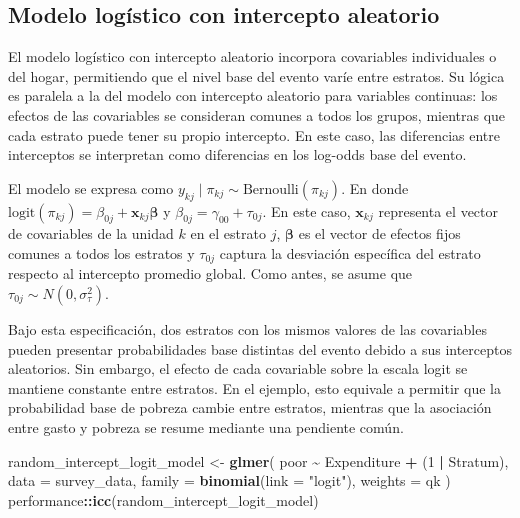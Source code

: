\documentclass[
  spanish,
  12pt,
]{book}
\newenvironment{Shaded}{\begin{snugshade}}{\end{snugshade}}
\newcommand{\AttributeTok}[1]{\textcolor[rgb]{0.13,0.29,0.53}{#1}}
\newcommand{\DecValTok}[1]{\textcolor[rgb]{0.00,0.00,0.81}{#1}}
\newcommand{\FunctionTok}[1]{\textcolor[rgb]{0.13,0.29,0.53}{\textbf{#1}}}
\newcommand{\NormalTok}[1]{#1}
\newcommand{\OtherTok}[1]{\textcolor[rgb]{0.56,0.35,0.01}{#1}}
\newcommand{\SpecialCharTok}[1]{\textcolor[rgb]{0.81,0.36,0.00}{\textbf{#1}}}
\newcommand{\StringTok}[1]{\textcolor[rgb]{0.31,0.60,0.02}{#1}}
\begin{document}
\subsection{Modelo logístico con intercepto aleatorio}\label{modelo-logistico-con-intercepto-aleatorio}

El modelo logístico con intercepto aleatorio incorpora covariables individuales o del hogar, permitiendo que el nivel base del evento varíe entre estratos. Su lógica es paralela a la del modelo con intercepto aleatorio para variables continuas: los efectos de las covariables se consideran comunes a todos los grupos, mientras que cada estrato puede tener su propio intercepto. En este caso, las diferencias entre interceptos se interpretan como diferencias en los log-odds base del evento.

El modelo se expresa como \(y_{kj} \mid \pi_{kj} \sim \text{Bernoulli}(\pi_{kj})\). En donde \(\text{logit}(\pi_{kj}) = \beta_{0j} + \mathbf{x}_{kj}\boldsymbol{\beta}\) y \(\beta_{0j} = \gamma_{00} + \tau_{0j}\). En este caso, \(\mathbf{x}_{kj}\) representa el vector de covariables de la unidad \(k\) en el estrato \(j\), \(\boldsymbol{\beta}\) es el vector de efectos fijos comunes a todos los estratos y \(\tau_{0j}\) captura la desviación específica del estrato respecto al intercepto promedio global. Como antes, se asume que \(\tau_{0j} \sim N(0,\sigma_{\tau}^{2})\).

Bajo esta especificación, dos estratos con los mismos valores de las covariables pueden presentar probabilidades base distintas del evento debido a sus interceptos aleatorios. Sin embargo, el efecto de cada covariable sobre la escala logit se mantiene constante entre estratos. En el ejemplo, esto equivale a permitir que la probabilidad base de pobreza cambie entre estratos, mientras que la asociación entre gasto y pobreza se resume mediante una pendiente común.

\begin{Shaded}
\begin{Highlighting}[]
\NormalTok{random\_intercept\_logit\_model }\OtherTok{\textless{}{-}} \FunctionTok{glmer}\NormalTok{(}
\NormalTok{  poor }\SpecialCharTok{\textasciitilde{}}\NormalTok{ Expenditure }\SpecialCharTok{+}\NormalTok{ (}\DecValTok{1} \SpecialCharTok{|}\NormalTok{ Stratum),}
  \AttributeTok{data =}\NormalTok{ survey\_data,}
  \AttributeTok{family =} \FunctionTok{binomial}\NormalTok{(}\AttributeTok{link =} \StringTok{"logit"}\NormalTok{),}
  \AttributeTok{weights =}\NormalTok{ qk}
\NormalTok{)}
\NormalTok{performance}\SpecialCharTok{::}\FunctionTok{icc}\NormalTok{(random\_intercept\_logit\_model)}
\end{Highlighting}
\end{Shaded}
\end{document}
